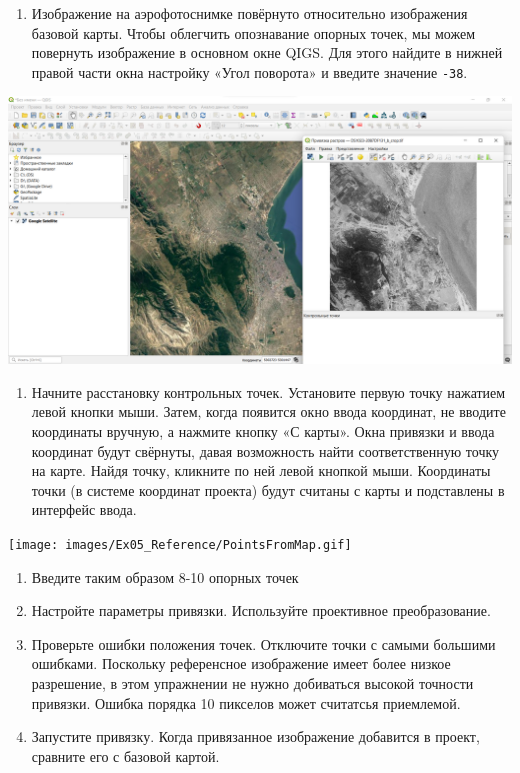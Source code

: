\documentclass[
  12pt,
]{book}
\providecommand{\tightlist}{%
  \setlength{\itemsep}{0pt}\setlength{\parskip}{0pt}}
\begin{document}
\begin{enumerate}
\def\labelenumi{\arabic{enumi}.}
\setcounter{enumi}{4}
\tightlist
\item
  Изображение на аэрофотоснимке повёрнуто относительно изображения базовой карты. Чтобы облегчить опознавание опорных точек, мы можем повернуть изображение в основном окне QIGS. Для этого найдите в нижней правой части окна настройку «Угол поворота» и введите значение \texttt{-38}.
\end{enumerate}

\includegraphics{images/Ex05_Reference/RasterReference7.png}

\begin{enumerate}
\def\labelenumi{\arabic{enumi}.}
\setcounter{enumi}{5}
\tightlist
\item
  Начните расстановку контрольных точек. Установите первую точку нажатием левой кнопки мыши. Затем, когда появится окно ввода координат, не вводите координаты вручную, а нажмите кнопку «С карты». Окна привязки и ввода координат будут свёрнуты, давая возможность найти соответственную точку на карте. Найдя точку, кликните по ней левой кнопкой мыши. Координаты точки (в системе координат проекта) будут считаны с карты и подставлены в интерфейс ввода.
\end{enumerate}

\texttt{[image: images/Ex05\_Reference/PointsFromMap.gif]}

\begin{enumerate}
\def\labelenumi{\arabic{enumi}.}
\setcounter{enumi}{6}
\item
  Введите таким образом 8-10 опорных точек
\item
  Настройте параметры привязки. Используйте проективное преобразование.
\item
  Проверьте ошибки положения точек. Отключите точки с самыми большими ошибками. Поскольку референсное изображение имеет более низкое разрешение, в этом упражнении не нужно добиваться высокой точности привязки. Ошибка порядка 10 пикселов может считатсья приемлемой.
\item
  Запустите привязку. Когда привязанное изображение добавится в проект, сравните его с базовой картой.
\end{enumerate}
\end{document}
